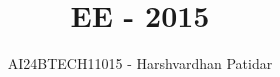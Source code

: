 \documentclass[journal]{IEEEtran}
\begin{document}

\vspace{3cm}

\title{EE - 2015}
\author{AI24BTECH11015 - Harshvardhan Patidar}
 \maketitle
{\let\newpage\relax\maketitle}

\renewcommand{\thefigure}{\theenumi}
\renewcommand{\thetable}{\theenumi}
\setlength{\intextsep}{10pt} %


\renewcommand{\thetable}{\theenumi}
\end{document}

